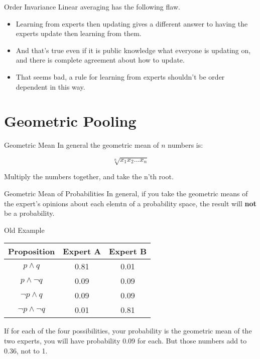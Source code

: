 \documentclass[
  ignorenonframetext,
]{beamer}
\providecommand{\tightlist}{%
  \setlength{\itemsep}{0pt}\setlength{\parskip}{0pt}}
\begin{document}
\begin{frame}{Order Invariance}
\protect\hypertarget{order-invariance}{}
Linear averaging has the following flaw.

\begin{itemize}
\tightlist
\item
  Learning from experts then updating gives a different answer to having
  the experts update then learning from them.
\item
  And that's true even if it is public knowledge what everyone is
  updating on, and there is complete agreement about how to update.
\item
  That seems bad, a rule for learning from experts shouldn't be order
  dependent in this way.
\end{itemize}
\end{frame}

\hypertarget{geometric-pooling}{%
\section{Geometric Pooling}\label{geometric-pooling}}

\begin{frame}{Geometric Mean}
\protect\hypertarget{geometric-mean}{}
In general the geometric mean of \(n\) numbers is:

\[
\sqrt[n]{x_1 x_2 \dots x_n}
\]

Multiply the numbers together, and take the n'th root.
\end{frame}

\begin{frame}{Geometric Mean of Probabilities}
\protect\hypertarget{geometric-mean-of-probabilities}{}
In general, if you take the geometric means of the expert's opinions
about each elemtn of a probability space, the result will \textbf{not}
be a probability.
\end{frame}

\begin{frame}{Old Example}
\protect\hypertarget{old-example}{}
\begin{longtable}[]{@{}ccc@{}}
\toprule
Proposition & Expert A & Expert B \\
\midrule
\endhead
\(p \wedge q\) & 0.81 & 0.01 \\
\(p \wedge \neg q\) & 0.09 & 0.09 \\
\(\neg p \wedge q\) & 0.09 & 0.09 \\
\(\neg p \wedge \neg q\) & 0.01 & 0.81 \\
\bottomrule
\end{longtable}

If for each of the four possibilities, your probability is the geometric
mean of the two experts, you will have probability 0.09 for each. But
those numbers add to 0.36, not to 1.
\end{frame}
\end{document}
